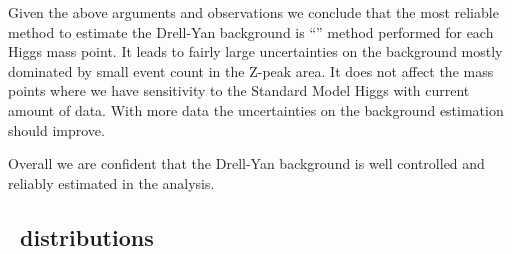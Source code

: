 Given the above arguments and observations we conclude that the most
reliable method to estimate the Drell-Yan background is ``\routin''
method performed for each Higgs mass point. It leads to fairly large
uncertainties on the background mostly dominated by small event count
in the Z-peak area. It does not affect the mass points where we have
sensitivity to the Standard Model Higgs with current amount of
data. With more data the uncertainties on the background estimation
should improve.

Overall we are confident that the Drell-Yan background is well
controlled and reliably estimated in the analysis.

\clearpage
\appendix 
\subsection{\routin\ distributions}
